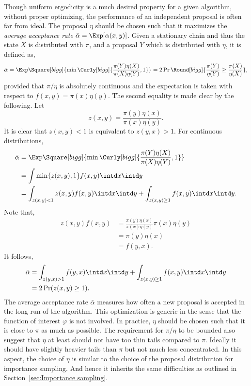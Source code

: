 Though uniform ergodicity is a much desired property for a given algorithm,
without proper optimizing, the performance of an independent proposal is often
far from ideal. The proposal $\eta$ should be chosen such that it maximizes the
\emph{average acceptance rate} $\bar\alpha = \Exp[\alpha(x,y)]$. Given a
stationary chain and thus the state $X$ is distributed with $\pi$, and a
proposal $Y$ which is distributed with $\eta$, it is defined as,
\begin{equation}
  \bar\alpha
  = \Exp\Square[bigg]{\min\Curly[bigg]{\frac{\pi(Y)\eta(X)}{\pi(X)\eta(Y)},1}}
  = 2\Pr\Round[bigg]{\frac{\pi(Y)}{\eta(Y)}\ge\frac{\pi(X)}{\eta(X)}},
\end{equation}
provided that $\pi/\eta$ is absolutely continuous and the expectation is taken
with respect to $f(x,y) = \pi(x)\eta(y)$. The second equality is made clear by
the following. Let
\begin{equation*}
  z(x,y) = \frac{\pi(y)\eta(x)}{\pi(x)\eta(y)}.
\end{equation*}
It is clear that $z(x,y) < 1$ is equivalent to $z(y,x)>1$. For continuous
distributions,
\begin{align*}
  \bar\alpha
  &=\Exp\Square[bigg]{
    \min\Curly[bigg]{\frac{\pi(Y)\eta(X)}{\pi(X)\eta(Y)},1}} \\
  &= \int \min\{z(x,y),1\} f(x,y)\intd x \intd y \\
  &= \int_{z(x,y) < 1} z(x,y)f(x,y) \intd x \intd y
  + \int_{z(x,y)\ge1} f(x,y)\intd x \intd y. \\
\end{align*}
Note that,
\begin{align*}
  z(x,y)f(x,y)
  &= \frac{\pi(y)\eta(x)}{\pi(x)\eta(y)}\pi(x)\eta(y) \\
  &= \pi(y)\eta(x) \\
  &= f(y,x).
\end{align*}
It follows,
\begin{align*}
  \bar\alpha
  &= \int_{z(y,x) > 1} f(y, x) \intd x \intd y
  + \int_{z(x,y)\ge1} f(x,y) \intd x \intd y\\
  &= 2\Pr(z(x,y)\ge1).
\end{align*}
The average acceptance rate $\bar\alpha$ measures how often a new proposal is
accepted in the long run of the algorithm. This optimization is generic in the
sense that the function of interest $\varphi$ is not involved. In practice,
$\eta$ should be chosen such that it is close to $\pi$ as much as possible.
The requirement for $\pi/\eta$ to be bounded also suggest that $\eta$ at least
should not have too thin tails compared to $\pi$.  Ideally it should have
slightly heavier tails than $\pi$ but not much less concentrated. In this
aspect, the choice of $\eta$ is similar to the choice of the proposal
distribution for importance sampling. And hence it inherits the same
difficulties as outlined in Section~\ref{sec:Importance sampling}.


